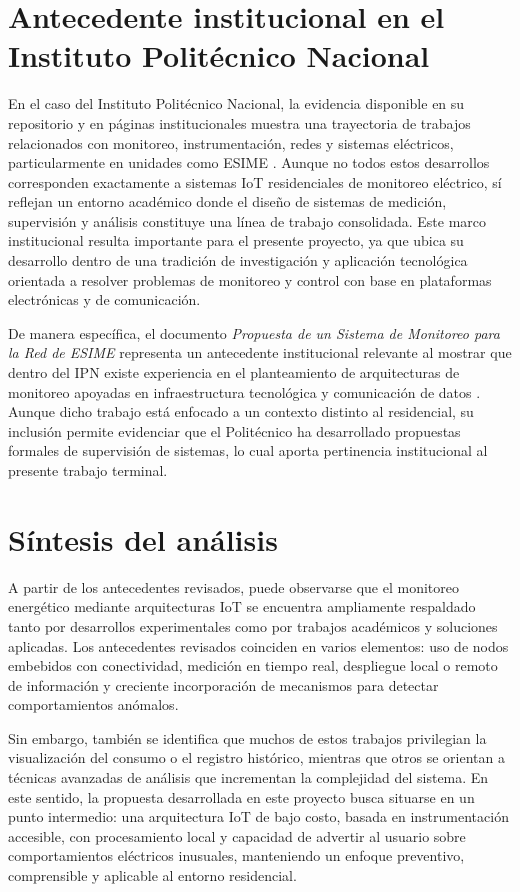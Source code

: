 ﻿\documentclass[12pt,openright,oneside]{report}
\theoremstyle{mytheoremstyle}
\theoremstyle{mytheoremstyle}
\theoremstyle{myproblemstyle}
\begin{document}
\section{Antecedente institucional en el Instituto Politécnico Nacional}

En el caso del Instituto Politécnico Nacional, la evidencia disponible en su repositorio y en páginas institucionales muestra una trayectoria de trabajos relacionados con monitoreo, instrumentación, redes y sistemas eléctricos, particularmente en unidades como ESIME \cite{ipn-esime-tesis,ipn-monitoring-network}. Aunque no todos estos desarrollos corresponden exactamente a sistemas IoT residenciales de monitoreo eléctrico, sí reflejan un entorno académico donde el diseño de sistemas de medición, supervisión y análisis constituye una línea de trabajo consolidada. Este marco institucional resulta importante para el presente proyecto, ya que ubica su desarrollo dentro de una tradición de investigación y aplicación tecnológica orientada a resolver problemas de monitoreo y control con base en plataformas electrónicas y de comunicación.

De manera específica, el documento \textit{Propuesta de un Sistema de Monitoreo para la Red de ESIME} representa un antecedente institucional relevante al mostrar que dentro del IPN existe experiencia en el planteamiento de arquitecturas de monitoreo apoyadas en infraestructura tecnológica y comunicación de datos \cite{ipn-monitoring-network}. Aunque dicho trabajo está enfocado a un contexto distinto al residencial, su inclusión permite evidenciar que el Politécnico ha desarrollado propuestas formales de supervisión de sistemas, lo cual aporta pertinencia institucional al presente trabajo terminal.

\section{Síntesis del análisis}

A partir de los antecedentes revisados, puede observarse que el monitoreo energético mediante arquitecturas IoT se encuentra ampliamente respaldado tanto por desarrollos experimentales como por trabajos académicos y soluciones aplicadas. Los antecedentes revisados coinciden en varios elementos: uso de nodos embebidos con conectividad, medición en tiempo real, despliegue local o remoto de información y creciente incorporación de mecanismos para detectar comportamientos anómalos.

Sin embargo, también se identifica que muchos de estos trabajos privilegian la visualización del consumo o el registro histórico, mientras que otros se orientan a técnicas avanzadas de análisis que incrementan la complejidad del sistema. En este sentido, la propuesta desarrollada en este proyecto busca situarse en un punto intermedio: una arquitectura IoT de bajo costo, basada en instrumentación accesible, con procesamiento local y capacidad de advertir al usuario sobre comportamientos eléctricos inusuales, manteniendo un enfoque preventivo, comprensible y aplicable al entorno residencial.
\end{document}
